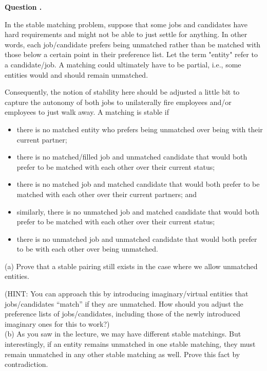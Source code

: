 \documentclass[12pt]{article}
\newcounter{questionnumber}
\newenvironment{question}[1][]{\stepcounter{questionnumber}\par\noindent\textbf{Question \thequestionnumber. #1}\par}{\par}
\begin{document}
\begin{question}
    In the stable matching problem, suppose that some jobs and candidates have hard requirements and might not be able to just settle for anything. In other words, each job/candidate prefers being unmatched rather than be matched with those below a certain point in their preference list. Let the term "entity" refer to a candidate/job. A matching could ultimately have to be partial, i.e., some entities would and should remain unmatched.

    Consequently, the notion of stability here should be adjusted a little bit to capture the autonomy of both jobs to unilaterally fire employees and/or employees to just walk away. A matching is stable if
    \begin{itemize}
    \item there is no matched entity who prefers being unmatched over being with their current partner;
    \item there is no matched/filled job and unmatched candidate that would both prefer to be matched with each other over their current status;
    \item there is no matched job and matched candidate that would both prefer to be matched with each other over their current partners; and
    \item similarly, there is no unmatched job and matched candidate that would both prefer to be matched with each other over their current status;
    \item there is no unmatched job and unmatched candidate that would both prefer to be with each other over being unmatched.
    \end{itemize}
    (a) Prove that a stable pairing still exists in the case where we allow unmatched entities.

    (HINT: You can approach this by introducing imaginary/virtual entities that jobs/candidates ``match'' if they are unmatched. How should you adjust the preference lists of jobs/candidates, including those of the newly introduced imaginary ones for this to work?)\\
    (b) As you saw in the lecture, we may have different stable matchings. But interestingly, if an entity remains unmatched in one stable matching, they must remain unmatched in any other stable matching as well. Prove this fact by contradiction.
\end{question}
\end{document}
